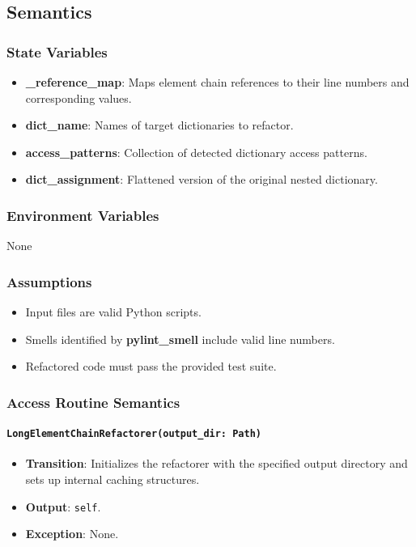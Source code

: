 \documentclass[12pt, titlepage]{article}
\begin{document}
\subsection{Semantics}

\subsubsection{State Variables}

\begin{itemize}
\item \textbf{\_reference\_map}: Maps element chain references to their line numbers and corresponding values.
\item \textbf{dict\_name}: Names of target dictionaries to refactor.
\item \textbf{access\_patterns}: Collection of detected dictionary access patterns.
\item \textbf{dict\_assignment}: Flattened version of the original nested dictionary.
\end{itemize}

\subsubsection{Environment Variables}
None

\subsubsection{Assumptions}

\begin{itemize}
\item Input files are valid Python scripts.
\item Smells identified by \textbf{pylint\_smell} include valid line numbers.
\item Refactored code must pass the provided test suite.
\end{itemize}

\subsubsection{Access Routine Semantics}

\paragraph{\texttt{LongElementChainRefactorer(output\_dir: Path)}}
\begin{itemize}
\item \textbf{Transition}: Initializes the refactorer with the specified output directory and sets up internal caching structures.
\item \textbf{Output}: \texttt{self}.
\item \textbf{Exception}: None.
\end{itemize}
\end{document}
